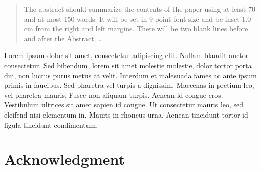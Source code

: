\documentclass{llncs2e/llncs}
\begin{document}
\vfill

\begin{abstract}
The abstract should summarize the contents of the paper
using at least 70 and at most 150 words. It will be set in 9-point
font size and be inset 1.0 cm from the right and left margins.
There will be two blank lines before and after the Abstract. \dots
{}
\end{abstract}
%
\newpage

Lorem ipsum dolor sit amet, consectetur adipiscing elit. Nullam blandit auctor
consectetur. Sed bibendum, lorem sit amet molestie molestie, dolor tortor porta
dui, non luctus purus metus at velit. Interdum et malesuada fames ac ante ipsum
primis in faucibus. Sed pharetra vel turpis a dignissim. Maecenas in pretium
leo, vel pharetra mauris. Fusce non aliquam turpis. Aenean id congue eros.
Vestibulum ultrices sit amet sapien id congue. Ut consectetur mauris leo, sed
eleifend nisi elementum in. Mauris in rhoncus urna. Aenean tincidunt tortor id
ligula tincidunt condimentum.

\section*{Acknowledgment}
\end{document}
